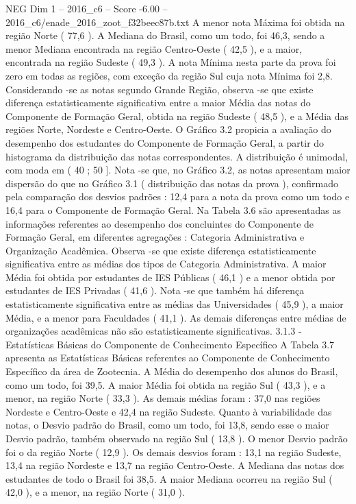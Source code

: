 \begin{textsample}{NEG Dim 1 – 2016\_c6 – Score -6.00 – 2016\_c6/enade\_2016\_zoot\_f32beec87b.txt}
A menor nota Máxima foi obtida na região Norte ( 77,6 ).
A Mediana do Brasil, como um todo, foi 46,3, sendo a menor Mediana encontrada na região Centro-Oeste ( 42,5 ), e a maior, encontrada na região Sudeste ( 49,3 ).
A nota Mínima nesta parte da prova foi zero em todas as regiões, com exceção da região Sul cuja nota Mínima foi 2,8.
Considerando -se as notas segundo Grande Região, observa -se que existe diferença estatisticamente significativa entre a maior Média das notas do Componente de Formação Geral, obtida na região Sudeste ( 48,5 ), e a Média das regiões Norte, Nordeste e Centro-Oeste.
O Gráfico 3.2 propicia a avaliação do desempenho dos estudantes do Componente de Formação Geral, a partir do histograma da distribuição das notas correspondentes.
A distribuição é unimodal, com moda em ( 40 ; 50 ].
Nota -se que, no Gráfico 3.2, as notas apresentam maior dispersão do que no Gráfico 3.1 ( distribuição das notas da prova ), confirmado pela comparação dos desvios padrões : 12,4 para a nota da prova como um todo e 16,4 para o Componente de Formação Geral.
Na Tabela 3.6 são apresentadas as informações referentes ao desempenho dos concluintes do Componente de Formação Geral, em diferentes agregações : Categoria Administrativa e Organização Acadêmica.
Observa -se que existe diferença estatisticamente significativa entre as médias dos tipos de Categoria Administrativa.
A maior Média foi obtida por estudantes de IES Públicas ( 46,1 ) e a menor obtida por estudantes de IES Privadas ( 41,6 ).
Nota -se que também há diferença estatisticamente significativa entre as médias das Universidades ( 45,9 ), a maior Média, e a menor para Faculdades ( 41,1 ).
As demais diferenças entre médias de organizações acadêmicas não são estatisticamente significativas. 3.1.3 - Estatísticas Básicas do Componente de Conhecimento Específico A Tabela 3.7 apresenta as Estatísticas Básicas referentes ao Componente de Conhecimento Específico da área de Zootecnia.
A Média do desempenho dos alunos do Brasil, como um todo, foi 39,5.
A maior Média foi obtida na região Sul ( 43,3 ), e a menor, na região Norte ( 33,3 ).
As demais médias foram : 37,0 nas regiões Nordeste e Centro-Oeste e 42,4 na região Sudeste.
Quanto à variabilidade das notas, o Desvio padrão do Brasil, como um todo, foi 13,8, sendo esse o maior Desvio padrão, também observado na região Sul ( 13,8 ).
O menor Desvio padrão foi o da região Norte ( 12,9 ).
Os demais desvios foram : 13,1 na região Sudeste, 13,4 na região Nordeste e 13,7 na região Centro-Oeste.
A Mediana das notas dos estudantes de todo o Brasil foi 38,5.
A maior Mediana ocorreu na região Sul ( 42,0 ), e a menor, na região Norte ( 31,0 ).

\end{textsample}
